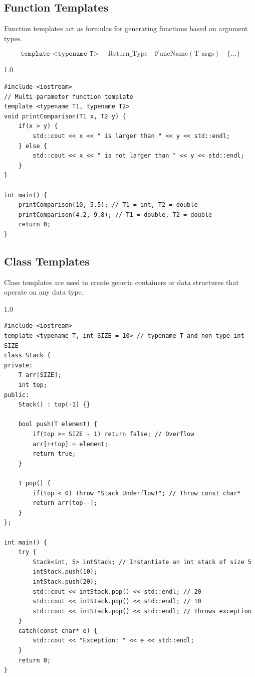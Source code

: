 \documentclass[12pt,a4paper]{article}
\begin{document}
\subsection{Function Templates}
Function templates act as formulas for generating functions based on argument types.
\begin{tcolorbox}[formulabox, title={\textbf{Function Template Syntax}}]
\begin{equation}
  \texttt{template <typename T> } \quad \text{Return\_Type} \quad \text{FuncName}(\text{T args}) \quad \{ \dots \}
\end{equation}
\end{tcolorbox}

\begin{tcolorbox}[examplebox, title={Code Example: Multi-parameter function template}]
\begin{spacing}{1.0}
\begin{verbatim}
#include <iostream>
// Multi-parameter function template
template <typename T1, typename T2>
void printComparison(T1 x, T2 y) {
    if(x > y) {
        std::cout << x << " is larger than " << y << std::endl;
    } else {
        std::cout << x << " is not larger than " << y << std::endl;
    }
}

int main() {
    printComparison(10, 5.5); // T1 = int, T2 = double
    printComparison(4.2, 9.8); // T1 = double, T2 = double
    return 0;
}
\end{verbatim}
\end{spacing}
\end{tcolorbox}

\subsection{Class Templates}
Class templates are used to create generic containers or data structures that operate on any data type.
\begin{tcolorbox}[examplebox, title={Code Example: Generic Stack class template}]
\begin{spacing}{1.0}
\begin{verbatim}
#include <iostream>
template <typename T, int SIZE = 10> // typename T and non-type int SIZE
class Stack {
private:
    T arr[SIZE];
    int top;
public:
    Stack() : top(-1) {}
    
    bool push(T element) {
        if(top >= SIZE - 1) return false; // Overflow
        arr[++top] = element;
        return true;
    }
    
    T pop() {
        if(top < 0) throw "Stack Underflow!"; // Throw const char*
        return arr[top--];
    }
};

int main() {
    try {
        Stack<int, 5> intStack; // Instantiate an int stack of size 5
        intStack.push(10);
        intStack.push(20);
        std::cout << intStack.pop() << std::endl; // 20
        std::cout << intStack.pop() << std::endl; // 10
        std::cout << intStack.pop() << std::endl; // Throws exception
    }
    catch(const char* e) {
        std::cout << "Exception: " << e << std::endl;
    }
    return 0;
}
\end{verbatim}
\end{spacing}
\end{tcolorbox}
\end{document}
